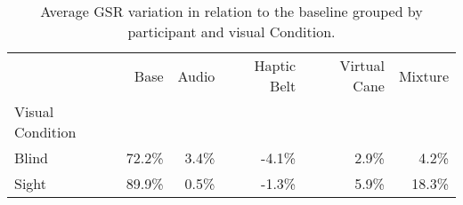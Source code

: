 
\begin{table}[!htb]
\centering
\caption{Average GSR variation in relation to the baseline grouped by participant and visual Condition.}
\label{tab:gsr_avg_table_def}
\begin{tabular}{lrrrrr}
\toprule
{} &    Base &  Audio & Haptic Belt & Virtual Cane & Mixture \\
Visual Condition &         &        &             &              &         \\
\midrule
Blind            &  72.2\% &  3.4\% &      -4.1\% &        2.9\% &   4.2\% \\
Sight            &  89.9\% &  0.5\% &      -1.3\% &        5.9\% &  18.3\% \\
\bottomrule
\end{tabular}
\end{table}

